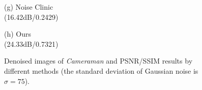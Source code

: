 \documentclass[runningheads]{llncs}
\begin{document}
\begin{figure}
{\begin{minipage}[t]{0.244\textwidth}
{\footnotesize (g) Noise Clinic \\(16.42dB/0.2429)}
\end{minipage}
\begin{minipage}[t]{0.244\textwidth}
\centering
{}
{\footnotesize (h) Ours \\(24.33dB/0.7321)}
\end{minipage}
}
\caption{Denoised images of \textsl{Cameraman} and PSNR/SSIM results by different methods (the standard deviation of Gaussian noise is $\sigma=75$).}
\label{fig7}
\end{figure}
\end{document}
